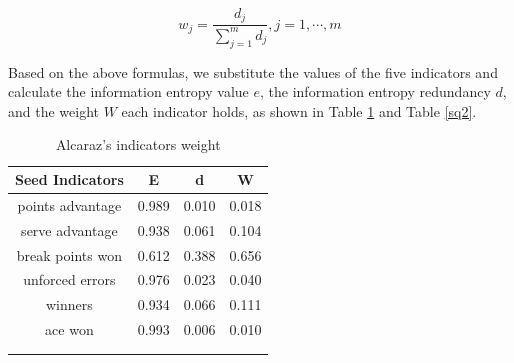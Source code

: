 \documentclass[12pt]{article}%
\begin{document}
\begin{equation}
	w_j=\frac{d_j}{\sum_{j=1}^m d_j}, j=1, \cdots, m
\end{equation}

Based on the above formulas, we substitute the values of the five indicators and calculate the information entropy value \( e \), the information entropy redundancy \( d \), and the weight \( W \) each indicator holds, as shown in Table \ref{sq1} and Table \ref{sq2}.

\begin{center}
\begin{minipage}{0.9\textwidth}
	\begin{minipage}[t]{0.52\textwidth}
		\begin{table}[H]
			\centering
			\fontsize{9}{11}\selectfont
			\caption{Alcaraz's indicators weight\label{sq1}}
			\begin{tabular}{cccc}
				\toprule[1.5pt]
				\rowcolor{yellow!50}
				Seed Indicators            & E                    & d                    & W                    \\
				\midrule[1pt]
				\rowcolor{yellow!30}
				\cellcolor{orange!40}	points advantage                & 0.989                & 0.010                & 0.018                \\
				\rowcolor{yellow!30}
				\cellcolor{orange!40}serve advantage
				& 0.938                & 0.061                & 0.104              \\
				\rowcolor{yellow!30}
				\cellcolor{orange!40}break points won
				& 0.612                & 0.388                & 0.656               \\
				\rowcolor{yellow!30}
				\cellcolor{orange!40}unforced errors
				& 0.976                & 0.023                & 0.040              \\
				\rowcolor{yellow!30}
				\cellcolor{orange!40}winners
				& 0.934                & 0.066                & 0.111               \\
				\rowcolor{yellow!30}
				\cellcolor{orange!40}ace won
				& 0.993                & 0.006                & 0.010              \\
				\bottomrule[1.5pt]
				\multicolumn{1}{l}{} & \multicolumn{1}{l}{} & \multicolumn{1}{l}{} & \multicolumn{1}{l}{} \\
				\multicolumn{1}{l}{} & \multicolumn{1}{l}{} & \multicolumn{1}{l}{} & \multicolumn{1}{l}{}
				\label{w}
			\end{tabular}
			\vspace{3pt}

\end{table}
\end{minipage}
\end{minipage}
\end{center}
\end{document}
